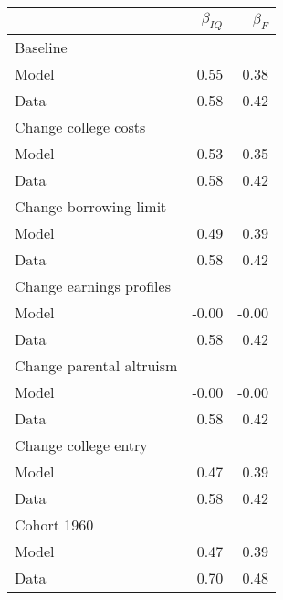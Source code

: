\begin{tabular}{lrr}
\hline
  & $\beta_{IQ}$  & $\beta_{F}$  \\ 
\hline
Baseline &   &   \\ 
Model & 0.55  & 0.38  \\ 
Data & 0.58  & 0.42  \\ 
Change college costs &   &   \\ 
Model & 0.53  & 0.35  \\ 
Data & 0.58  & 0.42  \\ 
Change borrowing limit &   &   \\ 
Model & 0.49  & 0.39  \\ 
Data & 0.58  & 0.42  \\ 
Change earnings profiles &   &   \\ 
Model & -0.00  & -0.00  \\ 
Data & 0.58  & 0.42  \\ 
Change parental altruism &   &   \\ 
Model & -0.00  & -0.00  \\ 
Data & 0.58  & 0.42  \\ 
Change college entry &   &   \\ 
Model & 0.47  & 0.39  \\ 
Data & 0.58  & 0.42  \\ 
Cohort 1960 &   &   \\ 
Model & 0.47  & 0.39  \\ 
Data & 0.70  & 0.48  \\ 
\hline
\end{tabular}%
